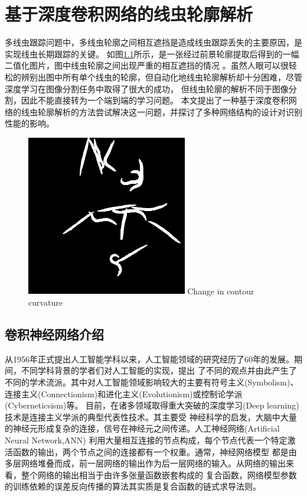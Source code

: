 \chapter{基于深度卷积网络的线虫轮廓解析}
	多线虫跟踪问题中，多线虫轮廓之间相互遮挡是造成线虫跟踪丢失的主要原因，是实现线虫长期跟踪的关键。
	如图\ref{fig:multiworm}所示，是一张经过前景轮廓提取后得到的一幅二值化图片，图中线虫轮廓之间出现严重的相互遮挡的情况
	。虽然人眼可以很轻松的辨别出图中所有单个线虫的轮廓，但自动化地线虫轮廓解析却十分困难，尽管深度学习在图像分割任务中取得了很大的成功，
	但线虫轮廓的解析不同于图像分割，因此不能直接转为一个端到端的学习问题。
	本文提出了一种基于深度卷积网络的线虫轮廓解析的方法尝试解决这一问题，并探讨了多种网络结构的设计对识别性能的影响。
	\begin{figure}[h]
	  \centering
	  \includegraphics[width=7cm]{figure/chap4/multi-worm.jpg}
		{Change in contour curvature}
	  \label{fig:multiworm}
	\end{figure}
\section{卷积神经网络介绍}
	从1956年正式提出人工智能学科以来，人工智能领域的研究经历了60年的发展。期间，不同学科背景的学者们对人工智能的实现，提出
	了不同的观点并由此产生了不同的学术流派。其中对人工智能领域影响较大的主要有符号主义(Symbolism)、
	连接主义(Connectionism)和进化主义(Evolutionism)或控制论学派(Cyberneticsism)等。
	目前，在诸多领域取得重大突破的深度学习(Deep learning)技术是连接主义学派的典型代表性技术。其主要受
	神经科学的启发，大脑中大量的神经元形成复杂的连接，信号在神经元之间传递。人工神经网络(Artificial Neural Network,ANN)
	利用大量相互连接的节点构成，每个节点代表一个特定激活函数的输出，两个节点之间的连接都有一个权重。通常，神经网络模型
	都是由多层网络堆叠而成，前一层网络的输出作为后一层网络的输入。从网络的输出来看，整个网络的输出相当于由许多张量函数嵌套构成的
	复合函数，网络模型参数的训练依赖的误差反向传播的算法其实质是复合函数的链式求导法则。
	
